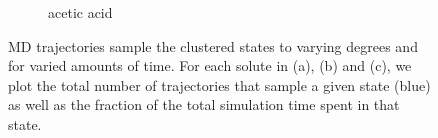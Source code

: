 \documentclass{article}
\begin{document}
\begin{figure}[h]
\begin{subfigure}{0.325\textwidth}
  \caption{acetic acid}\label{fig:prevalence_ACH}
  \end{subfigure}
  \caption{MD trajectories sample the clustered states to varying degrees and
  for varied amounts of time. For each solute in (a), (b) and (c), we plot
  the total number of trajectories that sample a given state (blue) as well
  as the fraction of the total simulation time spent in that state.}
  \label{fig:state_prevalence}
  \end{figure}
  
\end{document}
